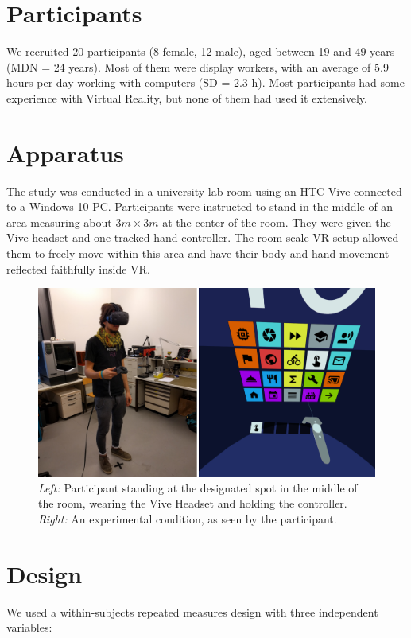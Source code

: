 \documentclass{tufte-book} %
\begin{document}
\section{Participants}
We recruited 20 participants (8 female, 12 male), aged between 19 and 49 years (MDN = 24 years). Most of them were display workers, with an average of 5.9 hours per day working with computers (SD = 2.3 h). Most participants had some experience with Virtual Reality, but none of them had used it extensively.

\section{Apparatus}
The study was conducted in a university lab room using an HTC Vive connected to a Windows 10 PC. Participants were instructed to stand in the middle of an area measuring about $3m \times 3m$ at the center of the room. They were given the Vive headset and one tracked hand controller. The room-scale VR setup allowed them to freely move within this area and have their body and hand movement reflected faithfully inside VR.

\begin{figure}
  \includegraphics{participant+view.png}
  \caption{\emph{Left:} Participant standing at the designated spot in the middle of the room, wearing the Vive Headset and holding the controller. \emph{Right:} An experimental condition, as seen by the participant.}
  \label{fig:participant-view}
\end{figure}

\section{Design}
We used a within-subjects repeated measures design with three independent variables:
\end{document}
